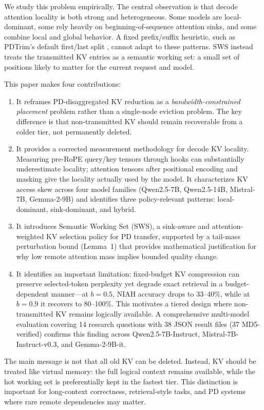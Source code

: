 \documentclass[11pt]{article}
\newcommand{\method}{SWS}
\newcommand{\fullmethod}{Semantic Working Set}
\newcommand{\pct}{\%}
\theoremstyle{definition}
\theoremstyle{plain}
\begin{document}
We study this problem empirically.  The central observation is that decode attention locality is both strong and heterogeneous.  Some models are local-dominant, some rely heavily on beginning-of-sequence attention sinks, and some combine local and global behavior.  A fixed prefix/suffix heuristic, such as PDTrim's default first/last split \citep{pdtrim}, cannot adapt to these patterns.  \method{} instead treats the transmitted KV entries as a semantic working set: a small set of positions likely to matter for the current request and model.

This paper makes four contributions:
\begin{enumerate}[leftmargin=1.5em,itemsep=2pt]
  \item It reframes PD-disaggregated KV reduction as a \emph{bandwidth-constrained placement} problem rather than a single-node eviction problem.  The key difference is that non-transmitted KV should remain recoverable from a colder tier, not permanently deleted.
  \item It provides a corrected measurement methodology for decode KV locality.  Measuring pre-RoPE query/key tensors through hooks can substantially underestimate locality; attention tensors after positional encoding and masking give the locality actually used by the model.  It characterizes KV access skew across four model families (Qwen2.5-7B, Qwen2.5-14B, Mistral-7B, Gemma-2-9B) and identifies three policy-relevant patterns: local-dominant, sink-dominant, and hybrid.
  \item It introduces \fullmethod{} (\method{}), a sink-aware and attention-weighted KV selection policy for PD transfer, supported by a tail-mass perturbation bound (Lemma~1) that provides mathematical justification for why low remote attention mass implies bounded quality change.
  \item It identifies an important limitation: fixed-budget KV compression can preserve selected-token perplexity yet degrade exact retrieval in a budget-dependent manner---at $b=0.5$, NIAH accuracy drops to 33--40\pct{}, while at $b=0.9$ it recovers to 80--100\pct{}.  This motivates a tiered design where non-transmitted KV remains logically available.  A comprehensive multi-model evaluation covering 14 research questions with 38 JSON result files (37 MD5-verified) confirms this finding across Qwen2.5-7B-Instruct, Mistral-7B-Instruct-v0.3, and Gemma-2-9B-it.
\end{enumerate}

The main message is not that all old KV can be deleted.  Instead, KV should be treated like virtual memory: the full logical context remains available, while the hot working set is preferentially kept in the fastest tier.  This distinction is important for long-context correctness, retrieval-style tasks, and PD systems where rare remote dependencies may matter.
\end{document}
